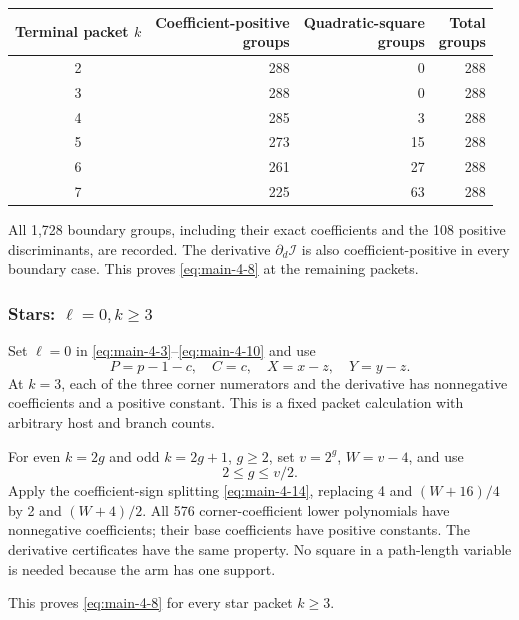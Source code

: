 \documentclass[11pt,letterpaper]{article}
\theoremstyle{plain}
\begin{document}
\begin{center}
\begin{tabular}{@{}c r r r@{}}
\toprule
\shortstack{\textbf{Terminal}\\\textbf{packet} $k$} &
\shortstack{\textbf{Coefficient-positive}\\\textbf{groups}} &
\shortstack{\textbf{Quadratic-square}\\\textbf{groups}} &
\shortstack{\textbf{Total}\\\textbf{groups}} \\
\midrule
2 & 288 & 0 & 288 \\
3 & 288 & 0 & 288 \\
4 & 285 & 3 & 288 \\
5 & 273 & 15 & 288 \\
6 & 261 & 27 & 288 \\
7 & 225 & 63 & 288 \\
\bottomrule
\end{tabular}
\end{center}

All 1,728 boundary groups, including their exact coefficients and the 108 positive discriminants, are recorded. The derivative \(\partial_d\mathcal I\) is also coefficient-positive in every boundary case. This proves \eqref{eq:main-4-8} at the remaining packets.

\subsubsection*{\texorpdfstring{Stars: \(\ell=0,k\ge3\)}{Stars: ell = 0, k >= 3}}\label{stars-ell0kge3}

Set \(\ell=0\) in \eqref{eq:main-4-3}--\eqref{eq:main-4-10} and use \[
P=p-1-c,\quad C=c,\quad X=x-z,\quad Y=y-z.
\] At \(k=3\), each of the three corner numerators and the derivative has nonnegative coefficients and a positive constant. This is a fixed packet calculation with arbitrary host and branch counts.

For even \(k=2g\) and odd \(k=2g+1\), \(g\ge2\), set \(v=2^g\), \(W=v-4\), and use \[
2\le g\le v/2.
\] Apply the coefficient-sign splitting \eqref{eq:main-4-14}, replacing 4 and \((W+16)/4\) by 2 and \((W+4)/2\). All 576 corner-coefficient lower polynomials have nonnegative coefficients; their base coefficients have positive constants. The derivative certificates have the same property. No square in a path-length variable is needed because the arm has one support.

This proves \eqref{eq:main-4-8} for every star packet \(k\ge3\).
\end{document}
